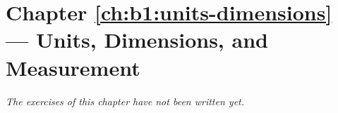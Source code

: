 \section*{Chapter \ref{ch:b1:units-dimensions} --- Units, Dimensions, and Measurement}


\emph{The exercises of this chapter have not been written yet.}
